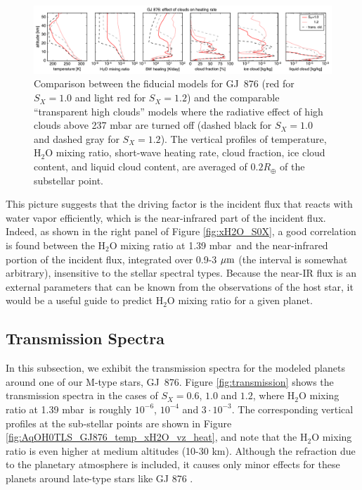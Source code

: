 \documentclass[11pt,numberedappendix,twocolappendix,]{emulateapj}
\def\water{H$_2$O }
\def\preslevel{1.39 mbar\ }
\begin{document}
\begin{figure}[htb]
    \begin{center}
    \includegraphics[width=1\hsize]{fig/GJ876_heat_cld.pdf}
    \end{center}
\caption{Comparison between the fiducial models for GJ~876 (red for $S_X=1.0$ and light red for $S_X=1.2$) and the comparable ``transparent high clouds'' models where the radiative effect of high clouds above 237 mbar are turned off (dashed black for $S_X=1.0$ and dashed gray for $S_X=1.2$). The vertical profiles of temperature, \water mixing ratio, short-wave heating rate, cloud fraction, ice cloud content, and liquid cloud content, are averaged of $0.2R_{\oplus }$ of the substellar point. }
\label{fig:GJ876_heat_cld}
\end{figure}

This picture suggests that the driving factor is the incident flux that reacts with water vapor efficiently, which is the near-infrared part of the incident flux. 
Indeed, as shown in the right panel of Figure \ref{fig:xH2O_S0X}, a good correlation is found between the \water mixing ratio at \preslevel and the near-infrared portion of the incident flux, integrated over 0.9-3 $\mu {\rm m}$ (the interval is somewhat arbitrary), insensitive to the stellar spectral types. 
Because the near-IR flux is an external parameters that can be known from the observations of the host star, it would be a useful guide to predict \water mixing ratio for a given planet. 


\subsection{Transmission Spectra}
\label{ss:result_TransmissionSpectra}

In this subsection, we exhibit the transmission spectra for the modeled planets around one of our M-type stars, GJ~876. 
Figure \ref{fig:transmission} shows the transmission spectra in the cases of $S_X=0.6$, $1.0$ and $1.2$, where \water mixing ratio at \preslevel is roughly $10^{-6}$, $10^{-4}$ and $3\cdot 10^{-3}$. 
The corresponding vertical profiles at the sub-stellar points are shown in Figure \ref{fig:AqOH0TLS_GJ876_temp_xH2O_vz_heat}, and note that the \water mixing ratio is even higher at medium altitudes (10-30 km). 
Although the refraction due to the planetary atmosphere is included, it causes only minor effects for these planets around late-type stars like GJ 876 \citep{Betremieux2014,Misra2014}. 
\end{document}
